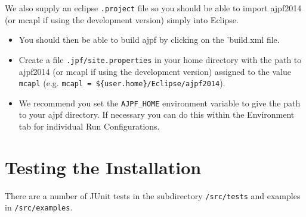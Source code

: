 We also supply an eclipse \texttt{.project} file so you should be able to import ajpf2014 (or mcapl if using the development version) simply into Eclipse.
\begin{itemize}
\item You should then be able to build ajpf by clicking on the 'build.xml file.
\item Create a file \texttt{.jpf/site.properties} in your home directory with the path to ajpf2014 (or mcapl if using the development version)  assigned to the value \texttt{mcapl} (e.g. \texttt{mcapl = \$\{user.home\}/Eclipse/ajpf2014}).
\item We recommend you set the \texttt{AJPF\_HOME} environment variable to give the path to your ajpf directory.  If necessary you can do this within the Environment tab for individual Run Configurations.
\end{itemize}

\section{Testing the Installation}

There are a number of JUnit tests in the subdirectory \texttt{/src/tests} and examples in \texttt{/src/examples}.

